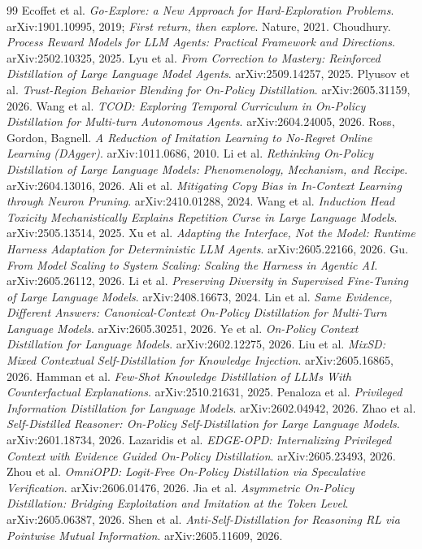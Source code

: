 \documentclass[11pt]{article}
\begin{document}
\begin{thebibliography}{99}
 Ecoffet et al. \emph{Go-Explore: a New Approach for Hard-Exploration Problems}. arXiv:1901.10995, 2019; \emph{First return, then explore}. Nature, 2021.
 Choudhury. \emph{Process Reward Models for LLM Agents: Practical Framework and Directions}. arXiv:2502.10325, 2025.
 Lyu et al. \emph{From Correction to Mastery: Reinforced Distillation of Large Language Model Agents}. arXiv:2509.14257, 2025.
 Plyusov et al. \emph{Trust-Region Behavior Blending for On-Policy Distillation}. arXiv:2605.31159, 2026.
 Wang et al. \emph{TCOD: Exploring Temporal Curriculum in On-Policy Distillation for Multi-turn Autonomous Agents}. arXiv:2604.24005, 2026.
 Ross, Gordon, Bagnell. \emph{A Reduction of Imitation Learning to No-Regret Online Learning (DAgger)}. arXiv:1011.0686, 2010.
 Li et al. \emph{Rethinking On-Policy Distillation of Large Language Models: Phenomenology, Mechanism, and Recipe}. arXiv:2604.13016, 2026.
 Ali et al. \emph{Mitigating Copy Bias in In-Context Learning through Neuron Pruning}. arXiv:2410.01288, 2024.
 Wang et al. \emph{Induction Head Toxicity Mechanistically Explains Repetition Curse in Large Language Models}. arXiv:2505.13514, 2025.
 Xu et al. \emph{Adapting the Interface, Not the Model: Runtime Harness Adaptation for Deterministic LLM Agents}. arXiv:2605.22166, 2026.
 Gu. \emph{From Model Scaling to System Scaling: Scaling the Harness in Agentic AI}. arXiv:2605.26112, 2026.
 Li et al. \emph{Preserving Diversity in Supervised Fine-Tuning of Large Language Models}. arXiv:2408.16673, 2024.
 Lin et al. \emph{Same Evidence, Different Answers: Canonical-Context On-Policy Distillation for Multi-Turn Language Models}. arXiv:2605.30251, 2026.
 Ye et al. \emph{On-Policy Context Distillation for Language Models}. arXiv:2602.12275, 2026.
 Liu et al. \emph{MixSD: Mixed Contextual Self-Distillation for Knowledge Injection}. arXiv:2605.16865, 2026.
 Hamman et al. \emph{Few-Shot Knowledge Distillation of LLMs With Counterfactual Explanations}. arXiv:2510.21631, 2025.
 Penaloza et al. \emph{Privileged Information Distillation for Language Models}. arXiv:2602.04942, 2026.
 Zhao et al. \emph{Self-Distilled Reasoner: On-Policy Self-Distillation for Large Language Models}. arXiv:2601.18734, 2026.
 Lazaridis et al. \emph{EDGE-OPD: Internalizing Privileged Context with Evidence Guided On-Policy Distillation}. arXiv:2605.23493, 2026.
 Zhou et al. \emph{OmniOPD: Logit-Free On-Policy Distillation via Speculative Verification}. arXiv:2606.01476, 2026.
 Jia et al. \emph{Asymmetric On-Policy Distillation: Bridging Exploitation and Imitation at the Token Level}. arXiv:2605.06387, 2026.
 Shen et al. \emph{Anti-Self-Distillation for Reasoning RL via Pointwise Mutual Information}. arXiv:2605.11609, 2026.
\end{thebibliography}
\end{document}
